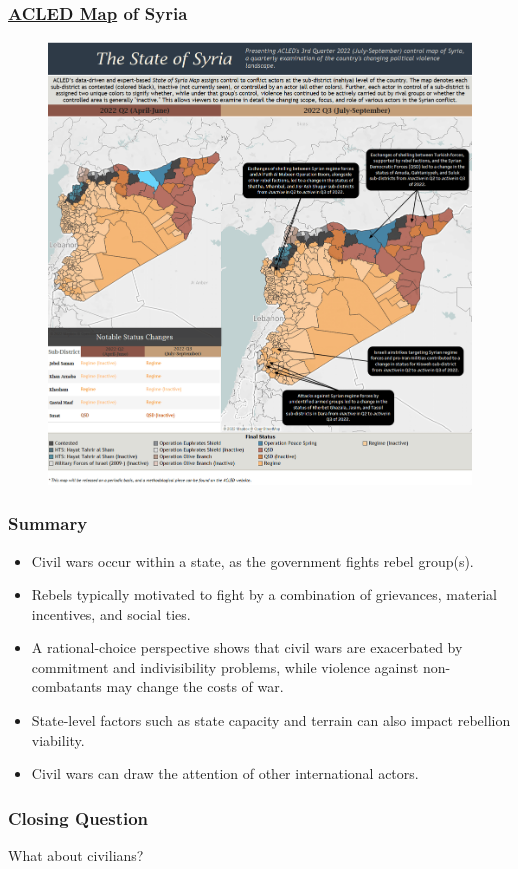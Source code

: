 \documentclass{beamer}
\begin{document}
%
\begin{frame} 
	\frametitle{\LARGE{\href{https://acleddata.com/2022/12/01/the-state-of-syria-q2-2022-q3-2022/}{ACLED Map} of Syria}}
	\begin{figure}[ht!]
		\centering
		\includegraphics[width=\textwidth,height=\textheight,keepaspectratio]{Syria-Q3-2022.png}
	\end{figure}
\end{frame}



\begin{frame} 
	\frametitle{\LARGE{Summary}}
	\begin{itemize}
		\item Civil wars occur within a state, as the government fights rebel group(s). \pause
		\item Rebels typically motivated to fight by a combination of grievances, material incentives, and social ties. \pause
		\item A rational-choice perspective shows that civil wars are exacerbated by commitment and indivisibility problems, while violence against non-combatants may change the costs of war. \pause
		\item State-level factors such as state capacity and terrain can also impact rebellion viability. \pause
		\item Civil wars can draw the attention of other international actors.
	\end{itemize}
\end{frame}

\begin{frame} 
	\frametitle{\LARGE{Closing Question}}
	\centering
	\Large{What about civilians?} 
\end{frame}
\end{document}
